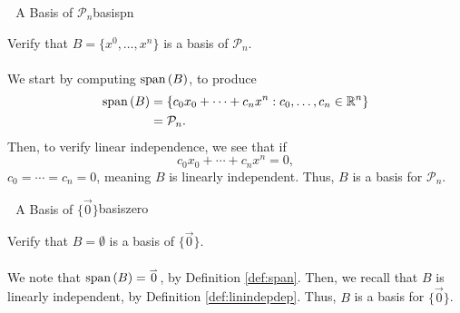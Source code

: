             \begin{example}{\Difficulty\,\Difficulty\,\Difficulty\,\,A Basis of \(\mathcal{P}_n\)}{basispn}

                Verify that \(B=\{x^0,\ldots,x^n\}\) is a basis of \(\mathcal{P}_n\).
                \\
                \\
                We start by computing \(\text{span\,}(B)\), to produce
                \begin{align*}
                    \text{span\,}(B)&=\{c_0x_0+\cdots+c_nx^n:c_0,\ldots,c_n\in\mathbb{R}^n\} \\
                    &=\mathcal{P}_n.
                \end{align*}
                Then, to verify linear independence, we see that if
                \begin{equation*}
                    c_0x_0+\cdots+c_nx^n=0,
                \end{equation*}
                \(c_0=\cdots=c_n=0\), meaning \(B\) is linearly independent. Thus, \(B\) is a basis for \(\mathcal{P}_n\).
            \end{example}
            \begin{example}{\Difficulty\,\Difficulty\,\Difficulty\,\,A Basis of \(\{\vec{0}\}\)}{basiszero}

                Verify that \(B=\emptyset\) is a basis of \(\{\vec{0}\}\).
                \\
                \\
                We note that \(\text{span\,}(B)=\overset{_{\rightharpoonup}}{0}\), by Definition \ref{def:span}. Then, we recall that \(B\) is linearly independent, by Definition \ref{def:linindepdep}. Thus, \(B\) is a basis for \(\{\vec{0}\}\).
            
            \end{example}
            \pagebreak
